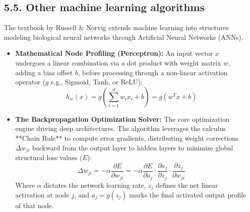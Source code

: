 \documentclass[11pt,a4paper]{article}
\begin{document}
\subsection{5.5. Other machine learning algorithms}
The textbook by Russell \& Norvig extends machine learning into structures modeling biological neural networks through Artificial Neural Networks (ANNs).
\begin{itemize}
    \item \textbf{Mathematical Node Profiling (Perceptron):} An input vector $x$ undergoes a linear combination via a dot product with weight matrix $w$, adding a bias offset $b$, before processing through a non-linear activation operator ($g$ e.g., Sigmoid, Tanh, or ReLU):
    \begin{equation}
        h_w(x) = g\left( \sum_{i=1}^{d} w_i x_i + b \right) = g(w^T x + b)
    \end{equation}
    \item \textbf{The Backpropagation Optimization Solver:} The core optimization engine driving deep architectures. The algorithm leverages the calculus **Chain Rule** to compute error gradients, distributing weight corrections $\Delta w_{ji}$ backward from the output layer to hidden layers to minimize global structural loss values ($E$):
    \begin{equation}
        \Delta w_{ji} = -\alpha \frac{\partial E}{\partial w_{ji}} = -\alpha \frac{\partial E}{\partial a_j} \cdot \frac{\partial a_j}{\partial z_j} \cdot \frac{\partial z_j}{\partial w_{ji}}
    \end{equation}
    Where $\alpha$ dictates the network learning rate, $z_j$ defines the net linear activation at node $j$, and $a_j = g(z_j)$ marks the final activated output profile of that node.
\end{itemize}

\newpage


\end{document}
